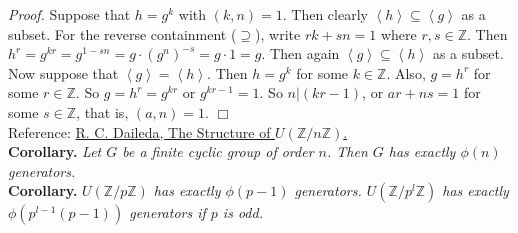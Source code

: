\documentclass{article}
\begin{document}
\emph{Proof.}
Suppose that $h = g^k$ with $(k, n) = 1$.
Then clearly $\left \langle h \right \rangle \subseteq \left \langle g \right \rangle$
as a subset. For the reverse containment ($\supseteq$),
write $rk + sn = 1$ where $r, s \in \mathbb{Z}$. Then
$h^r = g^{kr} = g^{1 - sn} = g \cdot (g^n)^{-s} = g \cdot 1 = g$. Then again
$\left \langle g \right \rangle \subseteq \left \langle h \right \rangle$ as a subset. \\

Now suppose that $\left \langle g \right \rangle = \left \langle h \right \rangle$.
Then $h = g^k$ for some $k \in \mathbb{Z}$. Also, $g = h^r$ for some $r \in \mathbb{Z}$.
So $g = h^r = g^{kr}$ or $g^{kr - 1} = 1$. So $n | (kr - 1)$, or
$ar + ns = 1$ for some $s \in \mathbb{Z}$, that is, $(a, n) = 1$.
$\Box$ \\

Reference:
\href{http://ramanujan.math.trinity.edu/rdaileda/teach/s18/m3341/ZnZ.pdf}
{R. C. Daileda, The Structure of $U(\mathbb{Z}/n\mathbb{Z})$.} \\

\textbf{Corollary.}
\emph{Let $G$ be a finite cyclic group of order $n$.
Then $G$ has exactly $\phi(n)$ generators.} \\

\textbf{Corollary.}
\emph{$U(\mathbb{Z}/p\mathbb{Z})$ has exactly $\phi(p - 1)$ generators.
$U(\mathbb{Z}/p^l\mathbb{Z})$ has exactly $\phi(p^{l-1}(p - 1))$ generators if $p$ is odd.} \\


\end{document}
